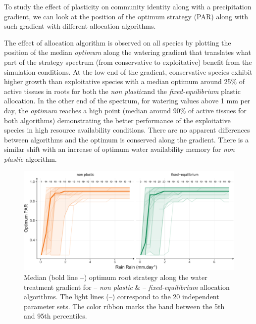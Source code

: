 To study the effect of plasticity on community identity along with a precipitation gradient, we can look at the position of the optimum strategy (PAR) along with such gradient with different allocation algorithms.


The effect of allocation algorithm is observed on all species by plotting the position of the median \textit{optimum} along the watering gradient that translates what part of the strategy spectrum (from conservative to exploitative) benefit from the simulation conditions. At the low end of the gradient, conservative species exhibit higher growth than exploitative species with a median optimum around 25\% of active tissues in roots for both the \textit{non plastic}and the \textit{fixed-equilibrium} plastic allocation. In the other end of the spectrum, for watering values above 1 mm per day, the \textit{optimum} reaches a high point (median around 90\% of active tissues for both algorithms) demonstrating the better performance of the exploitative species in high resource availability conditions.  There are no apparent differences between algorithms and the optimum is conserved along the gradient. There is a similar shift with an increase of optimum water availability memory for \textit{non plastic} algorithm.


\begin{figure}
\includegraphics[width = \textwidth]{./2_PP/Figures/Rain/gradient_strat_trend.pdf}
\caption{Median (bold line \textbf{--}) optimum root strategy along the water treatment gradient for \textcolor{myOrange}{-- \textit{non plastic}} \&  \textcolor{myGreen}{-- \textit{fixed-equilibrium}} allocation algorithms. The light lines (--) correspond to the 20 independent parameter sets. The color ribbon marks the band between the 5th and 95th percentiles.} \label{fig:gradient_strat_trend}%
\end{figure}

